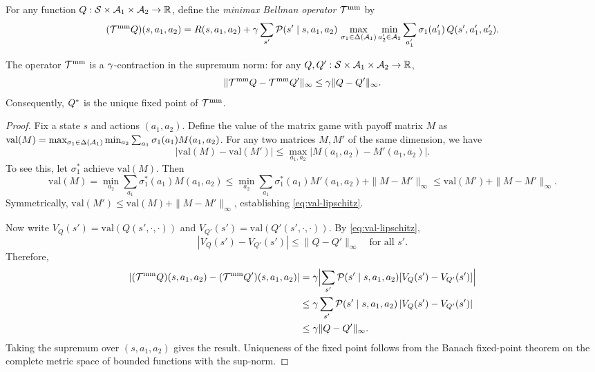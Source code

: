 \documentclass[11pt,a4paper]{article}
\begin{document}
\begin{definition}
\label{def:minimax-bellman}
For any function $Q : \mathcal{S} \times \mathcal{A}_1 \times \mathcal{A}_2 \to \mathbb{R}$,
define the \emph{minimax Bellman operator} $\mathcal{T}^{\mathrm{mm}}$ by
\begin{equation}
\label{eq:minimax-bellman-op}
  (\mathcal{T}^{\mathrm{mm}} Q)(s, a_1, a_2)
  = R(s, a_1, a_2)
  + \gamma \sum_{s'} \mathcal{P}(s' \mid s, a_1, a_2)\,
    \max_{\sigma_1 \in \Delta(\mathcal{A}_1)}
    \min_{a_2' \in \mathcal{A}_2}
    \sum_{a_1'} \sigma_1(a_1')\, Q(s', a_1', a_2').
\end{equation}
\end{definition}

\begin{theorem}
\label{thm:minimax-contraction}
The operator $\mathcal{T}^{\mathrm{mm}}$ is a $\gamma$-contraction in the
supremum norm: for any $Q, Q' : \mathcal{S} \times \mathcal{A}_1 \times
\mathcal{A}_2 \to \mathbb{R}$,
\[
  \| \mathcal{T}^{\mathrm{mm}} Q - \mathcal{T}^{\mathrm{mm}} Q' \|_\infty
  \le \gamma \| Q - Q' \|_\infty.
\]
Consequently, $Q^*$ is the unique fixed point of
$\mathcal{T}^{\mathrm{mm}}$.
\end{theorem}

\begin{proof}
Fix a state $s$ and actions $(a_1, a_2)$.  Define the value of the
matrix game with payoff matrix $M$ as
$\mathrm{val}(M) = \max_{\sigma_1 \in \Delta(\mathcal{A}_1)}
\min_{a_2} \sum_{a_1} \sigma_1(a_1) M(a_1, a_2)$.
For any two matrices $M, M'$ of the same dimension, we have
\begin{equation}
\label{eq:val-lipschitz}
  |\mathrm{val}(M) - \mathrm{val}(M')|
  \le \max_{a_1, a_2} |M(a_1, a_2) - M'(a_1, a_2)|.
\end{equation}
To see this, let $\sigma_1^*$ achieve $\mathrm{val}(M)$.  Then
\[
  \mathrm{val}(M)
  = \min_{a_2} \sum_{a_1} \sigma_1^*(a_1) M(a_1, a_2)
  \le \min_{a_2} \sum_{a_1} \sigma_1^*(a_1) M'(a_1, a_2)
    + \|M - M'\|_\infty
  \le \mathrm{val}(M') + \|M - M'\|_\infty.
\]
Symmetrically, $\mathrm{val}(M') \le \mathrm{val}(M) + \|M - M'\|_\infty$,
establishing \eqref{eq:val-lipschitz}.

Now write $V_Q(s') = \mathrm{val}(Q(s', \cdot, \cdot))$ and
$V_{Q'}(s') = \mathrm{val}(Q'(s', \cdot, \cdot))$.  By
\eqref{eq:val-lipschitz},
\[
  |V_Q(s') - V_{Q'}(s')| \le \|Q - Q'\|_\infty
  \quad \text{for all } s'.
\]
Therefore,
\begin{align*}
  |(\mathcal{T}^{\mathrm{mm}} Q)(s,a_1,a_2) - (\mathcal{T}^{\mathrm{mm}} Q')(s,a_1,a_2)|
  &= \gamma \Bigl| \sum_{s'} \mathcal{P}(s' \mid s,a_1,a_2)
     [V_Q(s') - V_{Q'}(s')] \Bigr| \\
  &\le \gamma \sum_{s'} \mathcal{P}(s' \mid s,a_1,a_2)\, |V_Q(s') - V_{Q'}(s')| \\
  &\le \gamma \|Q - Q'\|_\infty.
\end{align*}
Taking the supremum over $(s, a_1, a_2)$ gives the result.  Uniqueness
of the fixed point follows from the Banach fixed-point theorem on the
complete metric space of bounded functions with the sup-norm.
\end{proof}
\end{document}

